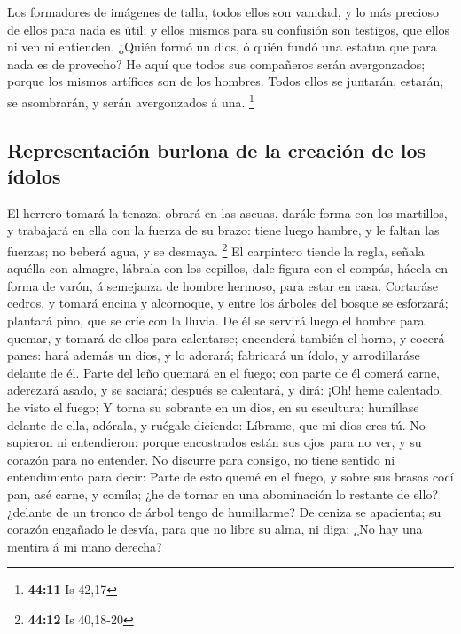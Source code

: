  Los formadores de imágenes de talla, todos ellos son
vanidad, y lo más precioso de ellos para nada es útil; y ellos mismos
para su confusión son testigos, que ellos ni ven ni entienden.
 ¿Quién formó un dios, ó quién fundó una estatua que para
nada es de provecho?  He aquí que todos sus compañeros
serán avergonzados; porque los mismos artífices son de los hombres.
Todos ellos se juntarán, estarán, se asombrarán, y serán avergonzados á
una. \footnote{\textbf{44:11} Is 42,17}

\hypertarget{representaciuxf3n-burlona-de-la-creaciuxf3n-de-los-uxeddolos}{%
\subsection{Representación burlona de la creación de los
ídolos}\label{representaciuxf3n-burlona-de-la-creaciuxf3n-de-los-uxeddolos}}

 El herrero tomará la tenaza, obrará en las ascuas, darále
forma con los martillos, y trabajará en ella con la fuerza de su brazo:
tiene luego hambre, y le faltan las fuerzas; no beberá agua, y se
desmaya. \footnote{\textbf{44:12} Is 40,18-20}  El
carpintero tiende la regla, señala aquélla con almagre, lábrala con los
cepillos, dale figura con el compás, hácela en forma de varón, á
semejanza de hombre hermoso, para estar en casa.  Cortaráse
cedros, y tomará encina y alcornoque, y entre los árboles del bosque se
esforzará; plantará pino, que se críe con la lluvia.  De él
se servirá luego el hombre para quemar, y tomará de ellos para
calentarse; encenderá también el horno, y cocerá panes: hará además un
dios, y lo adorará; fabricará un ídolo, y arrodillaráse delante de él.
 Parte del leño quemará en el fuego; con parte de él comerá
carne, aderezará asado, y se saciará; después se calentará, y dirá: ¡Oh!
heme calentado, he visto el fuego;  Y torna su sobrante en
un dios, en su escultura; humíllase delante de ella, adórala, y ruégale
diciendo: Líbrame, que mi dios eres tú.  No supieron ni
entendieron: porque encostrados están sus ojos para no ver, y su corazón
para no entender.  No discurre para consigo, no tiene
sentido ni entendimiento para decir: Parte de esto quemé en el fuego, y
sobre sus brasas cocí pan, asé carne, y comíla; ¿he de tornar en una
abominación lo restante de ello? ¿delante de un tronco de árbol tengo de
humillarme?  De ceniza se apacienta; su corazón engañado le
desvía, para que no libre su alma, ni diga: ¿No hay una mentira á mi
mano derecha?

